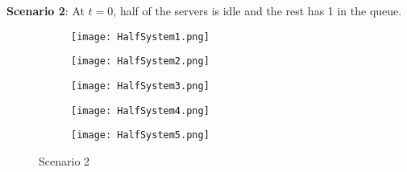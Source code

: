 \documentclass[11pt, reqno]{article}
\numberwithin{equation}{section}
\numberwithin{theorem}{section}
\begin{document}

\textbf{Scenario 2}: At $t=0$, half of the servers is idle and the rest has 1 in the queue.

\begin{figure}[!htb]
     \centering
     \begin{subfigure}[b]{0.3\textwidth}
         \centering
         \texttt{[image: HalfSystem1.png]}
     \end{subfigure}
     \hfill
     \begin{subfigure}[b]{0.3\textwidth}
         \centering
         \texttt{[image: HalfSystem2.png]}
     \end{subfigure}
     \hfill
     \begin{subfigure}[b]{0.3\textwidth}
         \centering
         \texttt{[image: HalfSystem3.png]}
     \end{subfigure}
     \hfill
     \begin{subfigure}[b]{0.3\textwidth}
         \centering
         \texttt{[image: HalfSystem4.png]}
     \end{subfigure}
     \begin{subfigure}[b]{0.3\textwidth}
         \centering
         \texttt{[image: HalfSystem5.png]}
     \end{subfigure}
     \caption{Scenario 2}
    \label{fig:sample path-half}
\end{figure}




%

\end{document}
